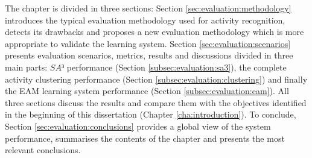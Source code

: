 The chapter is divided in three sections: Section \ref{sec:evaluation:methodology} introduces the typical evaluation methodology used for activity recognition, detects its drawbacks and proposes a new evaluation methodology which is more appropriate to validate the learning system. Section \ref{sec:evaluation:scenarios} presents evaluation scenarios, metrics, results and discussions divided in three main parts: $SA³$ performance (Section \ref{subsec:evaluation:sa3}), the complete activity clustering performance (Section \ref{subsec:evaluation:clustering}) and finally the EAM learning system performance (Section \ref{subsec:evaluation:eam}). All three sections discuss the results and compare them with the objectives identified in the beginning of this dissertation (Chapter \ref{cha:introduction}). To conclude, Section \ref{sec:evaluation:conclusions} provides a global view of the system performance, summarises the contents of the chapter and presents the most relevant conclusions.